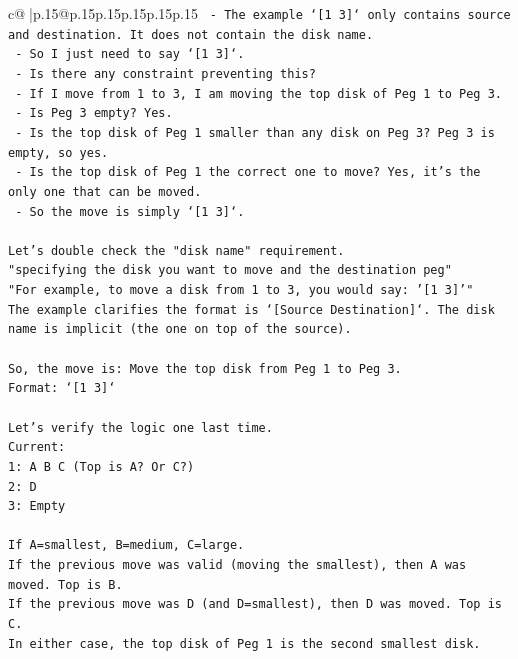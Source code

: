 \documentclass{article}
\begin{document}
{\begin{supertabular}{c@{$\;$}|p{.15\linewidth}@{}p{.15\linewidth}p{.15\linewidth}p{.15\linewidth}p{.15\linewidth}p{.15\linewidth}}
{{{\texttt{            {-} The example `{[}1 3{]}` only contains source and destination. It does not contain the disk name.} \\
\texttt{            {-} So I just need to say `{[}1 3{]}`.} \\
\texttt{            {-} Is there any constraint preventing this?} \\
\texttt{            {-} If I move from 1 to 3, I am moving the top disk of Peg 1 to Peg 3.} \\
\texttt{            {-} Is Peg 3 empty? Yes.} \\
\texttt{            {-} Is the top disk of Peg 1 smaller than any disk on Peg 3? Peg 3 is empty, so yes.} \\
\texttt{            {-} Is the top disk of Peg 1 the correct one to move? Yes, it's the only one that can be moved.} \\
\texttt{            {-} So the move is simply `{[}1 3{]}`.} \\
\\ 
\texttt{Let's double check the "disk name" requirement.} \\
\texttt{"specifying the disk you want to move and the destination peg"} \\
\texttt{"For example, to move a disk from 1 to 3, you would say: '{[}1 3{]}'"} \\
\texttt{The example clarifies the format is `{[}Source Destination{]}`. The disk name is implicit (the one on top of the source).} \\
\\ 
\texttt{So, the move is: Move the top disk from Peg 1 to Peg 3.} \\
\texttt{Format: `{[}1 3{]}`} \\
\\ 
\texttt{Let's verify the logic one last time.} \\
\texttt{Current:} \\
\texttt{1: A B C (Top is A? Or C?)} \\
\texttt{2: D} \\
\texttt{3: Empty} \\
\\ 
\texttt{If A=smallest, B=medium, C=large.} \\
\texttt{If the previous move was valid (moving the smallest), then A was moved. Top is B.} \\
\texttt{If the previous move was D (and D=smallest), then D was moved. Top is C.} \\
\texttt{In either case, the top disk of Peg 1 is the second smallest disk.} \\
}}}
\end{supertabular}}
\end{document}
